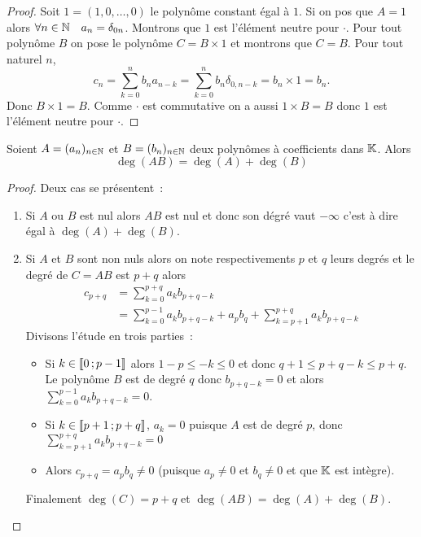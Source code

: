 \begin{proof}
  Soit \(1 = (1,0, \ldots, 0)\) le polynôme constant égal à \(1\). Si on pos que 
  \(A = 1\) alors \(\forall n \in \mathbb{N} \quad a_n = \delta_{0n}\). Montrons que \(1\) 
  est l'élément neutre pour \(\cdot\). Pour tout polynôme \(B\) on pose le 
  polynôme \(C = B \times 1\) et montrons que \(C = B\). Pour tout naturel \(n\),
  \begin{equation}
    c_n = \sum_{k = 0}^n b_{n} a_{n-k} = \sum_{k = 0}^n b_{n} \delta_{0,n-k} = b_n 
    \times 1 = b_n.
  \end{equation}
  Donc \(B \times 1 = B\). Comme \(\cdot\) est commutative on a aussi \(1 \times 
  B = B\) donc \(1\) est l'élément neutre pour \(\cdot\).
\end{proof}

\begin{prop}
  Soient \(A = (a_n)_{n \in \mathbb{N}}\) et \(B = (b_n)_{n \in \mathbb{N}}\) deux polynômes à 
  coefficients dans \(\mathbb{K}\). Alors
  \begin{equation}
    \deg(AB) = \deg(A)+\deg(B)
  \end{equation}
\end{prop}
\begin{proof}
  Deux cas se présentent~:
  \begin{enumerate}
    \item Si \(A\) ou \(B\) est nul alors \(AB\) est nul et donc son dégré vaut 
      \(-\infty\) c'est à dire égal à \(\deg(A)+\deg(B)\).
    \item Si \(A\) et \(B\) sont non nuls alors on note respectivements \(p\) et 
      \(q\) leurs degrés et le degré de \(C = AB\) est \(p+q\) alors
      \begin{align}
        c_{p+q} &= \sum_{k = 0}^{p+q} a_k b_{p+q-k} \\
        &= \sum_{k = 0}^{p-1} a_k b_{p+q-k} + a_pb_q + \sum_{k = p+1}^{p+q} a_k 
        b_{p+q-k}
      \end{align}
      Divisons l'étude en trois parties~:
      \begin{itemize}
        \item     Si \(k \in \mathopen{\llbracket}0\mathclose{}\mathpunct{};p-1\mathclose{\rrbracket}\) alors \(1-p \leqslant 
        -k \leqslant 0\) et donc \(q+1 \leqslant p+q-k \leqslant p+q\). Le 
      polynôme \(B\) est de degré \(q\) donc \(b_{p+q-k} = 0\) et alors 
    \(\sum_{k = 0}^{p-1} a_k b_{p+q-k} = 0\). \item Si \(k \in 
      \mathopen{\llbracket}p+1\mathclose{}\mathpunct{};p+q\mathclose{\rrbracket}\), \(a_k =0\) puisque \(A\) est de degré 
          \(p\), donc \(\sum_{k = p+1}^{p+q} a_k b_{p+q-k} = 0\)
      \item Alors \(c_{p+q} = a_pb_q \neq 0\) (puisque \(a_p \neq 0\) et \(b_q 
      \neq 0\) et que \(\mathbb{K}\) est intègre). \end{itemize}
      Finalement \(\deg(C) = p+q\) et \(\deg(AB) = \deg(A) + \deg(B)\).
  \end{enumerate}
\end{proof}

